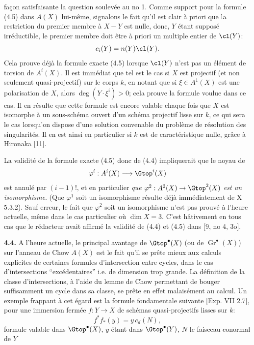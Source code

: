 façon satisfaisante la question soulevée au no 1. Comme support pour la formule (4.5) dans $A(X)$ lui-même, signalons le fait qu'il est clair à priori que la restriction du premier membre à $X-Y$ est nulle, donc, $Y$ étant supposé irréductible, le premier membre doit être à priori un multiple entier de $\cl(Y)$:
\[
 c_i(Y)=n(Y)\cl(Y).
\]
Cela prouve déjà la formule exacte (4.5) lorsque $\cl(Y)$ n'est pas un élément de torsion de $A^i(X)$. Il est immédiat que tel est le cas si $X$ est projectif (et non seulement quasi-projectif) sur le corps $k$, en notant que si $\xi\in A^1(X)$ est une polarisation de $X$, alors $\deg(Y\cdot\xi^i)>0$; cela prouve la formule voulue dans ce cas. Il en résulte que cette formule est encore valable chaque fois que $X$ est isomorphe à un sous-schéma ouvert d'un schéma projectif lisse sur $k$, ce qui sera le cas lorsqu'on dispose d'une solution convenable du problème de résolution des singularités. Il en est ainsi en particulier si $k$ est de caractéristique nulle, grâce à Hironaka [11].

La validité de la formule exacte (4.5) donc de (4.4) impliquerait que le noyau de
\[
 \varphi^i:A^i(X)\longrightarrow \Gtop^i(X)
\]
est annulé par $(i-1)!$, et en particulier \emph{que $\varphi^2:A^2(X)\to\Gtop^2(X)$ est un isomorphisme}. (Que $\varphi^1$ soit un isomorphisme résulte déjà immédiatement de X 5.3.2). Sauf erreur, le fait que $\varphi^2$ soit un isomorphisme n'est pas prouvé à l'heure actuelle, même dans le cas particulier où $\dim X=3$. C'est hâtivement en tous cas que le rédacteur avait affirmé la validité de (4.4) et (4.5) dans [9, no 4, 3o].

\textbf{4.4.} A l'heure actuelle, le principal avantage de $\Gtop^\bullet(X)$ (ou de $\operatorname{Gr}^\bullet(X)$) sur l'anneau de Chow $A(X)$ est le fait qu'il se prête mieux aux calculs explicites de certaines formules d'intersection entre cycles, dans le cas d'intersections ``excédentaires'' i.e. de dimension trop grande. La définition de la classe d'intersections, à l'aide du lemme de Chow permettant de bouger suffisamment un cycle dans sa classe, se prête en effet malaisément au calcul. Un exemple frappant à cet égard est la formule fondamentale suivante [Exp. VII 2.7], pour une immersion fermée $f:Y\to X$ de schémas quasi-projectifs lisses sur $k$:
\begin{equation}\tag{4.6}
 f^*f_*(y)=y\,c_d(N),
\end{equation}
formule valable dans $\Gtop^\bullet(X)$, $y$ étant dans $\Gtop^\bullet(Y)$, $N$ le faisceau conormal de $Y$
